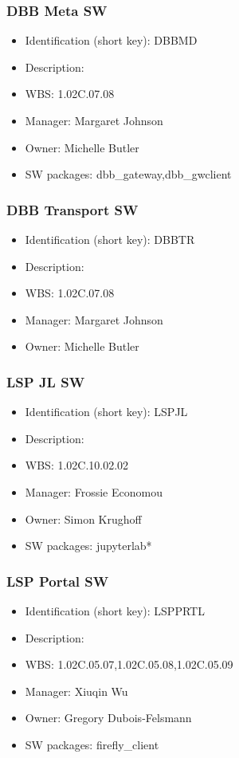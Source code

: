 \subsubsection{DBB Meta SW}\label{sect:DBBMD}
\begin{itemize}
\item Identification (short key): DBBMD
\item Description: 
\item WBS: 1.02C.07.08
\item Manager: Margaret Johnson
\item Owner: Michelle Butler
\item SW packages: dbb\_gateway,dbb\_gwclient
\end{itemize}

\subsubsection{DBB Transport SW}\label{sect:DBBTR}
\begin{itemize}
\item Identification (short key): DBBTR
\item Description: 
\item WBS: 1.02C.07.08
\item Manager: Margaret Johnson
\item Owner: Michelle Butler
\end{itemize}

\subsubsection{LSP JL SW}\label{sect:LSPJL}
\begin{itemize}
\item Identification (short key): LSPJL
\item Description: 
\item WBS: 1.02C.10.02.02
\item Manager: Frossie Economou
\item Owner: Simon Krughoff
\item SW packages: jupyterlab*
\end{itemize}

\subsubsection{LSP Portal SW}\label{sect:LSPPRTL}
\begin{itemize}
\item Identification (short key): LSPPRTL
\item Description: 
\item WBS: 1.02C.05.07,1.02C.05.08,1.02C.05.09
\item Manager: Xiuqin Wu
\item Owner: Gregory Dubois-Felsmann
\item SW packages: firefly\_client
\end{itemize}

